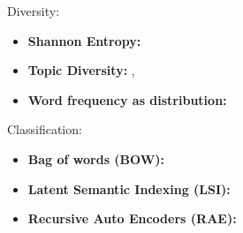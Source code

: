 \documentclass{article} %
\begin{document}
Diversity:
\begin{itemize}
\item {\bf Shannon  Entropy:}
\item{\bf Topic Diversity:} \cite{ganguly:2014}, \cite{bache:2013}
\item{\bf Word frequency as distribution:}
\end{itemize}



Classification:
\begin{itemize}
\item {\bf Bag of words (BOW):}
\item{\bf Latent Semantic Indexing (LSI):}
\item{\bf Recursive Auto Encoders (RAE):}
\end{itemize}
\end{document}

